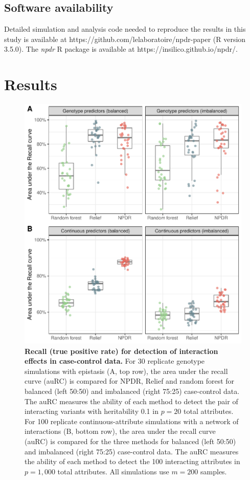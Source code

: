 \documentclass{bioinfo}
\begin{document}
\subsection{Software availability}
Detailed simulation and analysis code needed to reproduce the results in this study is available at {{https://github.com/lelaboratoire/npdr-paper}} (R version 3.5.0).
The \emph{npdr} R package is available at {{https://insilico.github.io/npdr/}}.


\section{Results}

\begin{figure}[!tbp]
\centerline{\includegraphics[scale = 0.55, clip]{../../figs/auRC.pdf}}
\caption{{\bf Recall (true positive rate) for detection of interaction effects in case-control data.} For 30 replicate genotype simulations with epistasis (A, top row), the area under the recall curve (auRC) is compared for NPDR, Relief and random forest for balanced (left 50:50) and  imbalanced (right 75:25) case-control data. The auRC measures the ability of each method to detect the pair of interacting variants with heritability 0.1 in $p=20$ total attributes. For 100 replicate continuous-attribute simulations with a network of interactions (B, bottom row), the area under the recall curve (auRC) is compared for the three methods for balanced (left 50:50) and  imbalanced (right 75:25) case-control data. The auRC measures the ability of each method to detect the 100 interacting attributes in $p=1,000$ total attributes. All simulations use $m = 200$ samples.}
\label{fig:rc_curve}
\end{figure}
\end{document}
